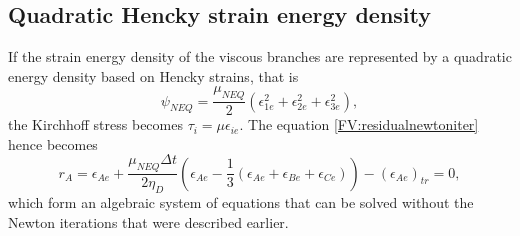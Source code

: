 \documentclass[11pt,twoside,TimesRoman]{article}
\newcommand{\parder}[2]{{\dfrac{\partial #1}{\partial #2}}}
\begin{document}
\subsection{Quadratic Hencky strain energy density}
If the strain energy density of the viscous branches are represented by a quadratic energy density based on Hencky strains, that is
\begin{equation}
	\psi_{NEQ} = \frac{\mu_{NEQ}}{2}  \left( \epsilon_{1e}^2 + \epsilon_{2e}^2+\epsilon_{3e}^2     \right),
\end{equation}
the Kirchhoff stress becomes $\tau_i = \mu \epsilon_{ie}$. The equation \ref{FV:residualnewtoniter} hence becomes
\begin{equation}
	r_A	 = \epsilon_{Ae} + \frac{\mu_{NEQ} \Delta t }{2 \eta_D} \left(\epsilon_{Ae} - \frac{1}{3} (\epsilon_{Ae}+\epsilon_{Be}+\epsilon_{Ce}) \right) - 	(\epsilon_{Ae})_{tr} = 0,
\end{equation}
which form an algebraic system of equations that can be solved without the Newton iterations that were described earlier. 


\end{document}
